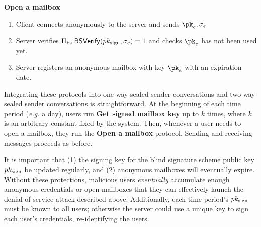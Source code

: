 \medskip \noindent
\textbf{Open a mailbox}
\begin{enumerate}[noitemsep]
  \item Client connects anonymously to the server and sends $\pk_e, \sigma_e$
  \item Server verifies $\Pi_{\text{bs}}.\mathsf{BSVerify}(pk_{\text{sign}}, \sigma_e) = 1$ and checks $\pk_e$ has not been used yet.  
  \item Server registers an anonymous mailbox with key $\pk_e$ with an expiration date.
\end{enumerate}

Integrating these protocols into one-way sealed sender conversations and two-way sealed sender conversations is straightforward.  At the beginning of each time period ({\em e.g.} a day), users run {\bf Get signed mailbox key} up to $k$ times, where $k$ is an arbitrary constant fixed by the system.  Then, whenever a user needs to open a mailbox, they run the {\bf Open a mailbox} protocol.  Sending and receiving messages proceeds as before.

It is important that (1) the signing key for the blind signature scheme public key $pk_{\text{sign}}$ be updated regularly, and (2) anonymous mailboxes will eventually expire.  Without these protections, malicious users {\em eventually} accumulate enough anonymous credentials or open mailboxes that they can effectively launch the denial of service attack described above.  Additionally, each time period's $pk_{\text{sign}}$ must be known to all users; otherwise the server could use a unique key to sign each user's credentials, re-identifying the users.
